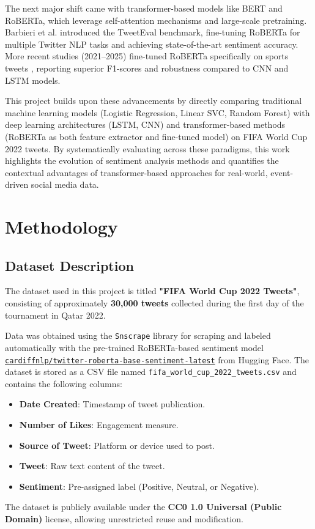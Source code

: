\documentclass[10pt]{article}
\begin{document}
The next major shift came with transformer-based models like BERT and RoBERTa, which leverage self-attention mechanisms and large-scale pretraining. Barbieri et al. \cite{ref3} introduced the TweetEval benchmark, fine-tuning RoBERTa for multiple Twitter NLP tasks and achieving state-of-the-art sentiment accuracy. More recent studies (2021–2025) fine-tuned RoBERTa specifically on sports tweets \cite{ref4}, reporting superior F1-scores and robustness compared to CNN and LSTM models.

This project builds upon these advancements by directly comparing traditional machine learning models (Logistic Regression, Linear SVC, Random Forest) with deep learning architectures (LSTM, CNN) and transformer-based methods (RoBERTa as both feature extractor and fine-tuned model) on FIFA World Cup 2022 tweets. By systematically evaluating across these paradigms, this work highlights the evolution of sentiment analysis methods and quantifies the contextual advantages of transformer-based approaches for real-world, event-driven social media data.
\section{Methodology}

\subsection{Dataset Description}
The dataset used in this project is titled \textbf{"FIFA World Cup 2022 Tweets"}, consisting of approximately \textbf{30,000 tweets} collected during the first day of the tournament in Qatar 2022.

Data was obtained using the \texttt{Snscrape} library for scraping and labeled automatically with the pre-trained RoBERTa-based sentiment model
\href{https://huggingface.co/cardiffnlp/twitter-roberta-base-sentiment-latest}{\texttt{cardiffnlp/twitter-roberta-base-sentiment-latest}} from Hugging Face.
The dataset is stored as a CSV file named \texttt{fifa\_world\_cup\_2022\_tweets.csv} and contains the following columns:
\begin{itemize}
    \item \textbf{Date Created}: Timestamp of tweet publication.
    \item \textbf{Number of Likes}: Engagement measure.
    \item \textbf{Source of Tweet}: Platform or device used to post.
    \item \textbf{Tweet}: Raw text content of the tweet.
    \item \textbf{Sentiment}: Pre-assigned label (Positive, Neutral, or Negative).
\end{itemize}
The dataset is publicly available under the \textbf{CC0 1.0 Universal (Public Domain)} license, allowing unrestricted reuse and modification.
\end{document}
